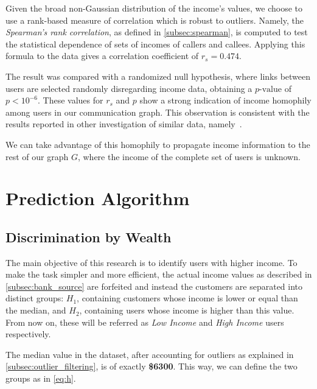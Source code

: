 Given the broad non-Gaussian distribution of the income's values, we choose to use a rank-based measure of correlation which is robust to outliers.
Namely, the \textit{Spearman's rank correlation}, as defined in \cref{subsec:spearman}, is computed to test the statistical dependence of sets of incomes of callers and callees.
Applying this formula to the data gives a correlation coefficient of $r_s = 0.474$.

The result was compared with a randomized null hypothesis, where links between users are selected randomly disregarding income data, obtaining a $p\text{-value}$ of $p < 10^{-6}$.
These values for $r_s$ and $p$ show a strong indication of income homophily among users in our communication graph.
This observation is consistent with the results reported in other investigation of similar data, namely~\cite{leo2015socioeconomic}.

We can take advantage of this homophily to propagate income information to the rest of our graph $G$, where the income of the complete set of users is unknown.

\section{Prediction Algorithm}
\label{subsec:prediction_algorithm}

\subsection{Discrimination by Wealth}
\label{subsec:discrimination_by_wealth}

The main objective of this research is to identify users with higher income. To make the task simpler and more efficient, the actual income values as described in \cref{subsec:bank_source} are forfeited and instead the customers are separated into distinct groups: $H_1$, containing customers whose income is lower or equal than the median, and $H_2$, containing users whose income is higher than this value. From now on, these will be referred as \emph{Low Income} and \emph{High Income} users respectively.

The median value in the dataset, after accounting for outliers as explained in \cref{subsec:outlier_filtering}, is of exactly \textbf{\$6300}\footnotemark{}. This way, we can define the two groups as in \cref{eq:h}.


